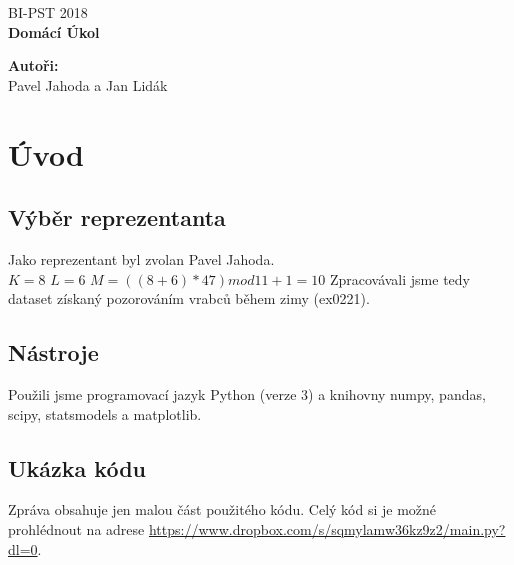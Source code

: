 \documentclass[12pt,a4paper]{article}
\begin{document}
\begin{titlepage}
  \thispagestyle{fancy}

  \vspace*{\fill}
  \begin{center}
    {\fontsize{20}{30}\selectfont BI-PST 2018}\\[1cm]
    {\fontsize{30}{100}\selectfont \textbf{Domácí Úkol}}\\[4.2cm]
  \end{center}

  \vspace*{\fill}

  {\fontsize{10}{10} \selectfont \noindent
  \textbf{Autoři:}\\
  Pavel Jahoda a Jan Lidák
  }
\end{titlepage}

\renewcommand{\headrulewidth}{0.4pt}
\renewcommand{\footrulewidth}{0.4pt}


\tableofcontents

\newpage


\section{Úvod}
\subsection{Výběr reprezentanta}
Jako reprezentant byl zvolan Pavel Jahoda.\\
$K = 8$
$L = 6$
$M = ((8+6)*47) mod 11 + 1 = 10$
Zpracovávali jsme tedy dataset získaný pozorováním vrabců během zimy (ex0221).
\subsection{Nástroje}
Použili jsme programovací jazyk Python (verze 3) a knihovny numpy, pandas, scipy, statsmodels a matplotlib.
\subsection{Ukázka kódu}
Zpráva obsahuje jen malou část použitého kódu. Celý kód si je možné prohlédnout na adrese \url{https://www.dropbox.com/s/sqmylamw36kz9z2/main.py?dl=0}.
\pagebreak
\end{document}
